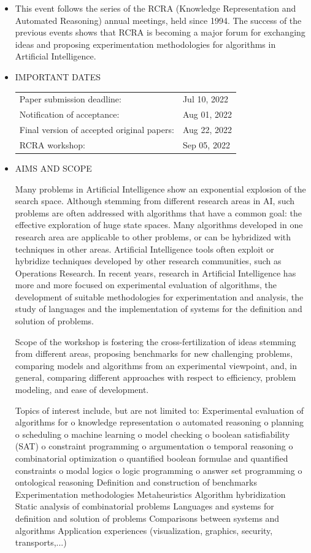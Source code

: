 \documentclass[prodmode,acmtecs]{acmsmall} %
\begin{document}
\begin{itemize}\item   This event follows the series of the RCRA (Knowledge Representation and Automated Reasoning) annual meetings, held since 1994. The success of the previous events shows that RCRA is becoming a major forum for exchanging ideas and proposing experimentation methodologies for algorithms in Artificial Intelligence. 
 
\item  IMPORTANT DATES  
 
\begin{tabulary}{\linewidth}{LL}Paper submission deadline:  & Jul 10, 2022 \\
Notification of acceptance:  & Aug 01, 2022 \\
Final version of accepted original papers:  & Aug 22, 2022 \\
RCRA workshop:  & Sep 05, 2022 \\
\end{tabulary}
 
\item  AIMS AND SCOPE 
 
  Many problems in Artificial Intelligence show an exponential explosion of the search space. Although stemming from different research areas in AI, such problems are often addressed with algorithms that have a common goal: the effective exploration of huge state spaces. Many algorithms developed in one research area are applicable to other problems, or can be hybridized with techniques in other areas. Artificial Intelligence tools often exploit or hybridize techniques developed by other research communities, such as Operations Research. In recent years, research in Artificial Intelligence has more and more focused on experimental evaluation of algorithms, the development of suitable methodologies for experimentation and analysis, the study of languages and the implementation of systems for the definition and solution of problems. 
 
  Scope of the workshop is fostering the cross-fertilization of ideas stemming from different areas, proposing benchmarks for new challenging problems, comparing models and algorithms from an experimental viewpoint, and, in general, comparing different approaches with respect to efficiency, problem modeling, and ease of development. 
 
  Topics of interest include, but are not limited to: Experimental evaluation of algorithms for o knowledge representation o automated reasoning o planning o scheduling o machine learning o model checking o boolean satisfiability (SAT) o constraint programming o argumentation o temporal reasoning o combinatorial optimization o quantified boolean formulae and quantified constraints o modal logics o logic programming o answer set programming o ontological reasoning Definition and construction of benchmarks Experimentation methodologies Metaheuristics Algorithm hybridization Static analysis of combinatorial problems Languages and systems for definition and solution of problems Comparisons between systems and algorithms Application experiences (visualization, graphics, security, transports,...)  
 

\end{itemize}
\end{document}
